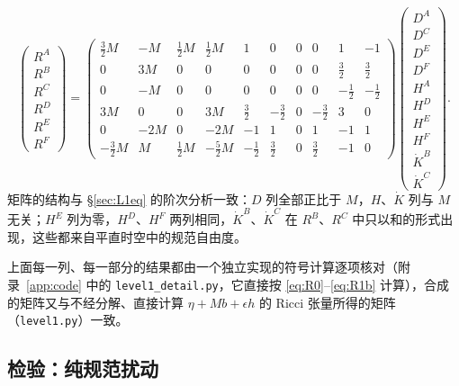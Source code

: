 \documentclass[11pt,a4paper]{ctexart}
\numberwithin{equation}{section}
\begin{document}
\begin{equation}
\begin{pmatrix}R^A\\R^B\\R^C\\R^D\\R^E\\R^F\end{pmatrix}
=\begin{pmatrix}
\tfrac32M & -M & \tfrac12M & \tfrac12M & 1 & 0 & 0 & 0 & 1 & -1\\
0 & 3M & 0 & 0 & 0 & 0 & 0 & 0 & \tfrac32 & \tfrac32\\
0 & -M & 0 & 0 & 0 & 0 & 0 & 0 & -\tfrac12 & -\tfrac12\\
3M & 0 & 0 & 3M & \tfrac32 & -\tfrac32 & 0 & -\tfrac32 & 3 & 0\\
0 & -2M & 0 & -2M & -1 & 1 & 0 & 1 & -1 & 1\\
-\tfrac32M & M & \tfrac12M & -\tfrac52M & -\tfrac12 & \tfrac32 & 0 & \tfrac32 & -1 & 0
\end{pmatrix}
\begin{pmatrix}D^A\\D^C\\D^E\\D^F\\H^A\\H^D\\H^E\\H^F\\\dot K^B\\\dot K^C\end{pmatrix}.
\label{eq:L1matrix}
\end{equation}
矩阵的结构与 \S\ref{sec:L1eq} 的阶次分析一致：$D$ 列全部正比于 $M$，$H$、$\dot K$ 列与 $M$ 无关；$H^E$ 列为零，$H^D$、$H^F$ 两列相同，$\dot K^B$、$\dot K^C$ 在 $R^B$、$R^C$ 中只以和的形式出现，这些都来自平直时空中的规范自由度。

上面每一列、每一部分的结果都由一个独立实现的符号计算逐项核对（附录~\ref{app:code} 中的 \texttt{level1\_detail.py}，它直接按 \eqref{eq:R0}--\eqref{eq:R1b} 计算），合成的矩阵又与不经分解、直接计算 $\eta+Mb+\epsilon h$ 的 Ricci 张量所得的矩阵（\texttt{level1.py}）一致。

\subsection{检验：纯规范扰动}
\end{document}
